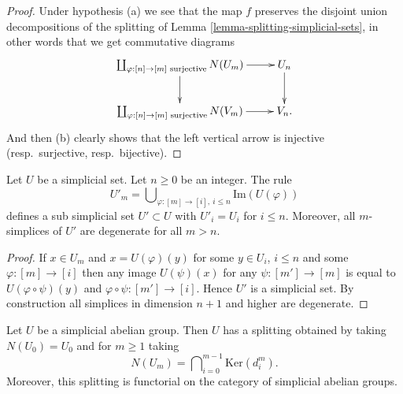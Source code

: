 \begin{proof}
Under hypothesis (a) we see that the map $f$ preserves
the disjoint union decompositions of the splitting
of Lemma \ref{lemma-splitting-simplicial-sets}, in other words
that we get commutative diagrams
$$
\xymatrix{
\coprod\nolimits_{\varphi : [n] \to [m]\text{ surjective}}
N(U_m)
\ar[r] \ar[d] &
U_n \ar[d] \\
\coprod\nolimits_{\varphi : [n] \to [m]\text{ surjective}}
N(V_m)
\ar[r] &
V_n.
}
$$
And then (b) clearly shows that the left vertical arrow is
injective (resp.\ surjective, resp.\ bijective).
\end{proof}

\begin{lemma}
\label{lemma-simplicial-set-n-skel-sub}
Let $U$ be a simplicial set.
Let $n \geq 0$ be an integer.
The rule
$$
U'_m = \bigcup\nolimits_{\varphi : [m] \to [i],\ i\leq n} \text{Im}(U(\varphi))
$$
defines a sub simplicial set $U' \subset U$ with
$U'_i = U_i$ for $i \leq n$.
Moreover, all $m$-simplices of $U'$ are degenerate for
all $m > n$.
\end{lemma}

\begin{proof}
If $x \in U_m$ and $x = U(\varphi)(y)$
for some $y \in U_i$, $i \leq n$ and some $\varphi : [m] \to [i]$
then any image $U(\psi)(x)$ for any $\psi : [m'] \to [m]$ is
equal to $U(\varphi \circ \psi)(y)$ and $\varphi \circ \psi :
[m'] \to [i]$. Hence $U'$ is a simplicial set. By construction
all simplices in dimension $n + 1$ and higher are degenerate.
\end{proof}

\begin{lemma}
\label{lemma-splitting-simplicial-groups}
Let $U$ be a simplicial abelian group.
Then $U$ has a splitting obtained by taking $N(U_0) = U_0$ and
for $m \geq 1$ taking
$$
N(U_m) = \bigcap\nolimits_{i = 0}^{m - 1} \text{Ker}(d^m_i).
$$
Moreover, this splitting is functorial on the category
of simplicial abelian groups.
\end{lemma}

